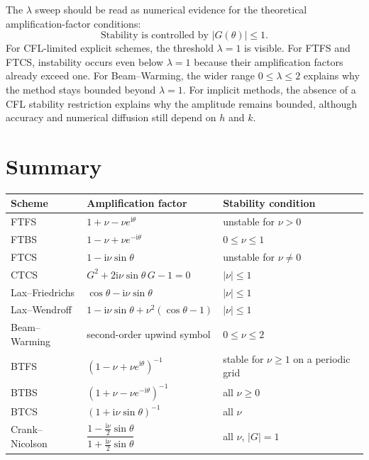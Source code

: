 \documentclass[11pt]{article}
\newcommand{\ii}{\mathrm{i}}
\begin{document}
The $\lambda$ sweep should be read as numerical evidence for the theoretical
amplification-factor conditions:
\begin{equation}
    \boxed{\text{Stability is controlled by } |G(\theta)|\le1.}
\end{equation}
For CFL-limited explicit schemes, the threshold $\lambda=1$ is visible.  For FTFS and
FTCS, instability occurs even below $\lambda=1$ because their amplification factors
already exceed one.  For Beam--Warming, the wider range $0\le\lambda\le2$ explains why
the method stays bounded beyond $\lambda=1$.  For implicit methods, the absence of a
CFL stability restriction explains why the amplitude remains bounded, although
accuracy and numerical diffusion still depend on $h$ and $k$.

\section{Summary}

\begin{table}[h]
\centering
\begin{tabular}{@{}lll@{}}
\toprule
Scheme & Amplification factor & Stability condition\\
\midrule
FTFS & $1+\nu-\nu e^{\ii\theta}$ & unstable for $\nu>0$\\
FTBS & $1-\nu+\nu e^{-\ii\theta}$ & $0\le\nu\le1$\\
FTCS & $1-\ii\nu\sin\theta$ & unstable for $\nu\ne0$\\
CTCS & $G^2+2\ii\nu\sin\theta\,G-1=0$ & $|\nu|\le1$\\
Lax--Friedrichs & $\cos\theta-\ii\nu\sin\theta$ & $|\nu|\le1$\\
Lax--Wendroff & $1-\ii\nu\sin\theta+\nu^2(\cos\theta-1)$ & $|\nu|\le1$\\
Beam--Warming & second-order upwind symbol & $0\le\nu\le2$\\
BTFS & $(1-\nu+\nu e^{\ii\theta})^{-1}$ & stable for $\nu\ge1$ on a periodic grid\\
BTBS & $(1+\nu-\nu e^{-\ii\theta})^{-1}$ & all $\nu\ge0$\\
BTCS & $(1+\ii\nu\sin\theta)^{-1}$ & all $\nu$\\
Crank--Nicolson & $\dfrac{1-\frac{\ii\nu}{2}\sin\theta}{1+\frac{\ii\nu}{2}\sin\theta}$ & all $\nu$, $|G|=1$\\
\bottomrule
\end{tabular}
\end{table}
\end{document}
